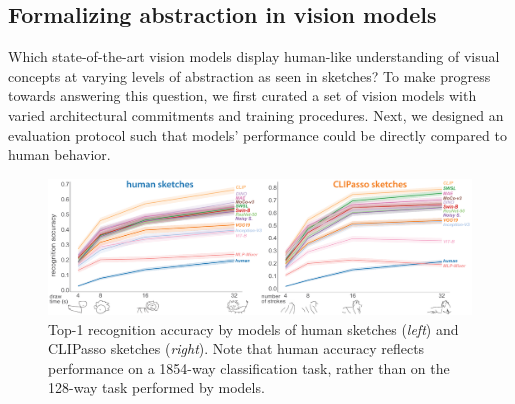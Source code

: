 \documentclass[10pt,letterpaper]{article}
\begin{document}
\subsection{Formalizing abstraction in vision models}
Which state-of-the-art vision models display human-like understanding of visual concepts at varying levels of abstraction as seen in sketches? 
To make progress towards answering this question, we first curated a set of vision models with varied architectural commitments and training procedures. 
Next, we designed an evaluation protocol such that models' performance could be directly compared to human behavior.

\begin{figure}
    \centering
\includegraphics[width=.9\linewidth]{figures/VAB_recog_no_mocov2.pdf}
    \vspace{-1em}
    \caption{Top-1 recognition accuracy by models of human sketches (\textit{left}) and CLIPasso sketches (\textit{right}). Note that human accuracy reflects performance on a 1854-way classification task, rather than on the 128-way task performed by models.}
    \vspace{-1em}
    \label{fig:VAB_recog}
\end{figure}
\end{document}
